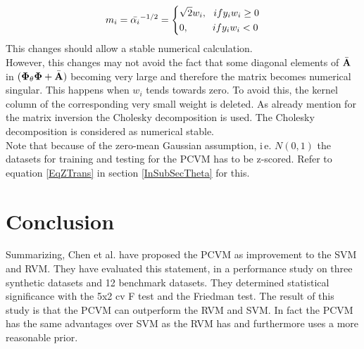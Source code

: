 \begin{equation}\label{EqPcvmMDiag}
	m_i = \bar{\alpha_i}^{-1/2} = 
	\begin{dcases}
		\sqrt{2}w_i,\>\>\> if y_iw_i \ge 0 \\
		0, \>\>\>\>\>\>\>\>\>\>\> if y_iw_i < 0		
		\end{dcases}
\end{equation}
This changes should allow a stable numerical calculation.\\
However, this changes may not avoid the fact that some diagonal elements of $\bar{\mathbf{A}}$ in $(\mathbf{\Phi}_\theta\mathbf{\Phi}+\bar{\mathbf{A}})$ becoming very large and therefore the matrix becomes numerical singular.
This happens when $w_i$ tends towards zero.
To avoid this, the kernel column of the corresponding very small weight is deleted. \cite{Chen.2014}\newline
As already mention for the matrix inversion the Cholesky decomposition is used.\cite{Chen.2014} The Cholesky decomposition is considered as numerical stable.\cite[p. 101]{Press.2007}\\
Note that because of the zero-mean Gaussian assumption, i\,e. $N(0,1)$ the datasets for training and testing for the \acs{PCVM} has to be z-scored.
Refer to equation \eqref{EqZTrans} in section \ref{InSubSecTheta} for this.
\section{Conclusion}
Summarizing, Chen et al. have proposed the \acs{PCVM} as improvement to the \acs{SVM} and \acs{RVM}.
They have evaluated this statement, in a performance study on three synthetic datasets and 12 benchmark datasets.
They determined statistical significance with the 5x2 cv F test and the Friedman test.
The result of this study is that the \acs{PCVM} can outperform the \acs{RVM} and \acs{SVM}.
In fact the \acs{PCVM} has the same advantages over \ac{SVM} as the \acs{RVM} has and furthermore uses a more reasonable prior.\cite{Chen.2009}
